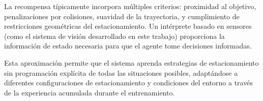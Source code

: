 La recompensa típicamente incorpora múltiples criterios: proximidad al objetivo, penalizaciones por colisiones,
suavidad de la trayectoria, y cumplimiento de restricciones geométricas del estacionamiento.
Un intérprete basado en sensores (como el sistema de visión desarrollado en este trabajo) proporciona
la información de estado necesaria para que el agente tome decisiones informadas.


Esta aproximación permite que el sistema aprenda estrategias de estacionamiento sin programación explícita
de todas las situaciones posibles, adaptándose a diferentes configuraciones de estacionamiento y
condiciones del entorno a través de la experiencia acumulada durante el entrenamiento.
